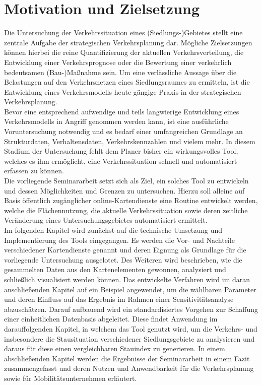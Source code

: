 \documentclass[12pt,a4paper]{scrartcl}
\begin{document}
  \pagestyle{headings}
  
\section{Motivation und Zielsetzung}

Die Untersuchung der Verkehrssituation eines (Siedlungs-)Gebietes stellt eine zentrale Aufgabe der strategischen Verkehrsplanung dar. Mögliche Zielsetzungen können hierbei die reine Quantifizierung der aktuellen Verkehrsverteilung, die Entwicklung einer Verkehrsprognose oder die Bewertung einer verkehrlich bedeutsamen (Bau-)Maßnahme sein. Um eine verlässliche Aussage über die Belastungen auf den Verkehrsnetzen eines Siedlungsraumes zu ermitteln, ist die Entwicklung eines Verkehrsmodells heute gängige Praxis in der strategischen Verkehrsplanung.\\
\newline
Bevor eine entsprechend aufwendige und teils langwierige Entwicklung eines Verkehrsmodells in Angriff genommen werden kann, ist eine ausführliche Voruntersuchung notwendig und es bedarf einer umfangreichen Grundlage an Strukturdaten, Verhaltensdaten, Verkehrskennzahlen und vielem mehr. In diesem Stadium der Untersuchung fehlt dem Planer bisher ein wirkungsvolles Tool, welches es ihm ermöglicht, eine Verkehrssituation schnell und automatisiert erfassen zu können.\\
\newline
Die vorliegende Seminararbeit setzt sich als Ziel, ein solches Tool zu entwickeln und dessen Möglichkeiten und Grenzen zu untersuchen. Hierzu soll alleine auf Basis öffentlich zugänglicher online-Kartendienste eine Routine entwickelt werden, welche die Flächennutzung, die aktuelle Verkehrssituation sowie deren zeitliche Veränderung eines Untersuchungsgebietes automatisiert ermittelt.\\
\newline
Im folgenden Kapitel wird zunächst auf die technische Umsetzung und Implementierung des Tools eingegangen. Es werden die Vor- und Nachteile verschiedener Kartendienste genannt und deren Eignung als Grundlage für die vorliegende Untersuchung ausgelotet. Des Weiteren wird beschrieben, wie die gesammelten Daten aus den Kartenelementen gewonnen, analysiert und schließlich visualisiert werden können. Das entwickelte Verfahren wird im daran anschließenden Kapitel auf ein Beispiel angewendet, um die wählbaren Parameter und deren Einfluss auf das Ergebnis im Rahmen einer Sensitivitätsanalyse abzuschätzen. Darauf aufbauend wird ein standardisiertes Vorgehen zur Schaffung einer einheitlichen Datenbasis abgeleitet. Diese findet Anwendung im darauffolgenden Kapitel, in welchem das Tool genutzt wird, um die Verkehrs- und insbesondere die Stausituation verschiedener Siedlungsgebiete zu analysieren und daraus für diese einen vergleichbaren Stauindex zu generieren. 
In einem abschließenden Kapitel werden die Ergebnisse der Seminararbeit in einem Fazit zusammengefasst und deren Nutzen und Anwendbarkeit für die Verkehrsplanung sowie für Mobilitätsunternehmen erläutert.
\end{document}
